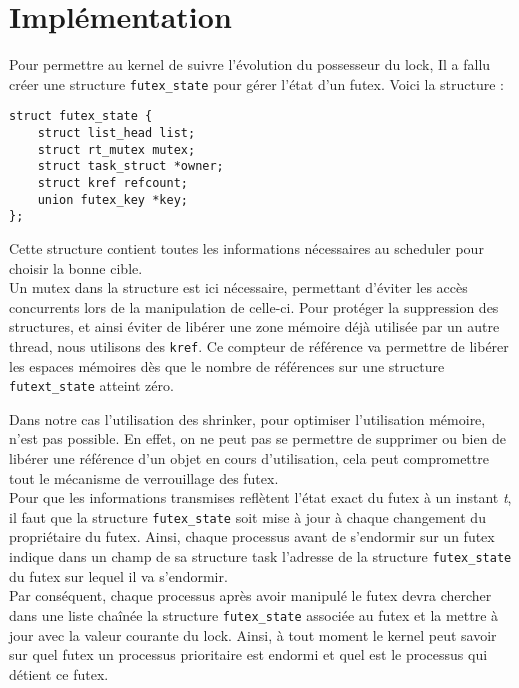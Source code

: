 \section*{Implémentation}

Pour permettre au kernel de suivre l'évolution du possesseur du lock, Il a
fallu créer une structure \verb|futex_state| pour gérer l'état d'un futex. 
Voici la structure :
\begin{lstlisting}
struct futex_state {
	struct list_head list;
	struct rt_mutex mutex;
	struct task_struct *owner;
	struct kref refcount;
	union futex_key *key;
};
\end{lstlisting}

Cette structure contient toutes les informations nécessaires au scheduler pour 
choisir la bonne cible.
\\

Un mutex dans la structure est ici nécessaire, permettant d'éviter les accès concurrents lors de la manipulation de celle-ci. Pour protéger la suppression des structures, et ainsi éviter de libérer une zone mémoire déjà utilisée par un autre thread, nous utilisons des \verb|kref|. Ce compteur de référence va permettre de libérer les espaces mémoires dès que le nombre de références sur une structure \verb|futext_state| atteint zéro.

Dans notre cas l'utilisation des shrinker, pour optimiser l'utilisation
mémoire, n'est pas possible. En effet, on ne peut pas se permettre de supprimer ou bien de libérer une référence d'un objet en cours d'utilisation, cela peut compromettre tout le mécanisme de verrouillage des futex.
\\

Pour que les informations transmises reflètent l'état exact du futex
à un instant \textit{t}, il faut que la structure \verb|futex_state| soit mise à jour
à chaque changement du propriétaire du futex. Ainsi, chaque processus avant de 
s'endormir sur un futex indique dans un champ de sa structure task l'adresse de 
la structure \verb|futex_state| du futex sur lequel il va s'endormir.
\\

Par conséquent, chaque processus après avoir manipulé le futex 
devra chercher dans une liste chaînée la structure \verb|futex_state| associée au 
futex et la mettre à jour avec la valeur courante du lock. Ainsi, à tout moment 
le kernel peut savoir sur quel futex un processus prioritaire est endormi et quel
est le processus qui détient ce futex.